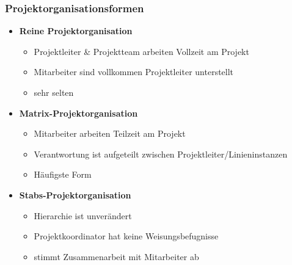 \subsubsection{Projektorganisationsformen}
\begin{multicols}{3}
	\begin{itemize}
		\item \textbf{Reine Projektorganisation}
		\begin{itemize}
			\item Projektleiter \& Projektteam arbeiten Vollzeit am Projekt
			\item Mitarbeiter sind vollkommen Projektleiter unterstellt
			\item sehr selten
		\end{itemize}
		\item \textbf{Matrix-Projektorganisation}
		\begin{itemize}
			\item Mitarbeiter arbeiten Teilzeit am Projekt
			\item Verantwortung ist aufgeteilt zwischen Projektleiter/Linieninstanzen
			\item Häufigste Form
		\end{itemize}
		\item \textbf{Stabs-Projektorganisation}
		\begin{itemize}
			\item Hierarchie ist unverändert
			\item Projektkoordinator hat keine Weisungsbefugnisse
			\item stimmt Zusammenarbeit mit Mitarbeiter ab
		\end{itemize}
	\end{itemize}
\end{multicols}

